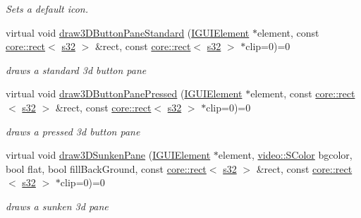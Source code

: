 \begin{DoxyCompactItemize}
\begin{DoxyCompactList}\small\item\em Sets a default icon. \end{DoxyCompactList}\item 
virtual void \hyperlink{classirr_1_1gui_1_1IGUISkin_a71becc9ffab32e4b2709bed573097d4b}{draw3\+D\+Button\+Pane\+Standard} (\hyperlink{classirr_1_1gui_1_1IGUIElement}{I\+G\+U\+I\+Element} $\ast$element, const \hyperlink{classirr_1_1core_1_1rect}{core\+::rect}$<$ \hyperlink{namespaceirr_ac66849b7a6ed16e30ebede579f9b47c6}{s32} $>$ \&rect, const \hyperlink{classirr_1_1core_1_1rect}{core\+::rect}$<$ \hyperlink{namespaceirr_ac66849b7a6ed16e30ebede579f9b47c6}{s32} $>$ $\ast$clip=0)=0
\begin{DoxyCompactList}\small\item\em draws a standard 3d button pane \end{DoxyCompactList}\item 
virtual void \hyperlink{classirr_1_1gui_1_1IGUISkin_aa31f1ba128b2149bf48fead506d53503}{draw3\+D\+Button\+Pane\+Pressed} (\hyperlink{classirr_1_1gui_1_1IGUIElement}{I\+G\+U\+I\+Element} $\ast$element, const \hyperlink{classirr_1_1core_1_1rect}{core\+::rect}$<$ \hyperlink{namespaceirr_ac66849b7a6ed16e30ebede579f9b47c6}{s32} $>$ \&rect, const \hyperlink{classirr_1_1core_1_1rect}{core\+::rect}$<$ \hyperlink{namespaceirr_ac66849b7a6ed16e30ebede579f9b47c6}{s32} $>$ $\ast$clip=0)=0
\begin{DoxyCompactList}\small\item\em draws a pressed 3d button pane \end{DoxyCompactList}\item 
virtual void \hyperlink{classirr_1_1gui_1_1IGUISkin_ae9db467e7b631d5462c7d2092efbc531}{draw3\+D\+Sunken\+Pane} (\hyperlink{classirr_1_1gui_1_1IGUIElement}{I\+G\+U\+I\+Element} $\ast$element, \hyperlink{classirr_1_1video_1_1SColor}{video\+::\+S\+Color} bgcolor, bool flat, bool fill\+Back\+Ground, const \hyperlink{classirr_1_1core_1_1rect}{core\+::rect}$<$ \hyperlink{namespaceirr_ac66849b7a6ed16e30ebede579f9b47c6}{s32} $>$ \&rect, const \hyperlink{classirr_1_1core_1_1rect}{core\+::rect}$<$ \hyperlink{namespaceirr_ac66849b7a6ed16e30ebede579f9b47c6}{s32} $>$ $\ast$clip=0)=0
\begin{DoxyCompactList}\small\item\em draws a sunken 3d pane \end{DoxyCompactList}\item 

\end{DoxyCompactItemize}
